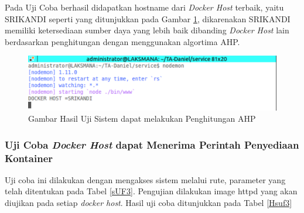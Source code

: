 Pada Uji Coba berhasil didapatkan hostname dari \textit{Docker Host} terbaik, yaitu SRIKANDI seperti yang ditunjukkan pada Gambar \ref{gambarujif1}, dikarenakan SRIKANDI memiliki ketersediaan sumber daya yang lebih baik dibanding \textit{Docker Host} lain berdasarkan penghitungan dengan menggunakan algortima AHP.

\begin{figure}[H]
\centering
\includegraphics[width=\linewidth]{images/bab5/Selection_005}
\caption{Gambar Hasil Uji Sistem dapat melakukan Penghitungan AHP }
\label{gambarujif1}
\end{figure}     


\subsubsection{Uji Coba \textit{Docker Host} dapat Menerima Perintah Penyediaan Kontainer}
      Uji coba ini dilakukan dengan mengakses sistem melalui rute, parameter  yang telah ditentukan pada Tabel \ref{sUF3}. Pengujian dilakukan image httpd yang akan diujikan pada setiap \textit{docker host}. Hasil uji coba ditunjukkan pada Tabel \ref{Hsuf3}
      
